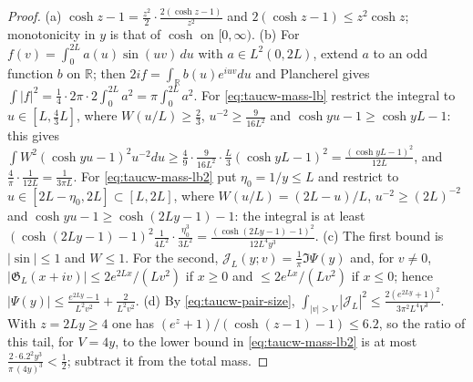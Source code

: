 \documentclass[11pt,a4paper]{article}
\numberwithin{equation}{section}
\theoremstyle{definition}
\theoremstyle{remark}
\begin{document}
\begin{proof}
(a) $\cosh z-1=\frac{z^2}2\cdot\frac{2(\cosh z-1)}{z^2}$ and $2(\cosh z-1)\le z^2\cosh z$; monotonicity in $y$ is that of $\cosh$ on $[0,\infty)$. (b) For $f(v)=\int_0^{2L}a(u)\sin(uv)\,du$ with $a\in L^2(0,2L)$, extend $a$ to an odd function $b$ on $\mathbb R$; then $2if=\int_{\mathbb R}b(u)e^{iuv}du$ and Plancherel gives $\int|f|^2=\frac14\cdot2\pi\cdot2\int_0^{2L}a^2=\pi\int_0^{2L}a^2$. For \eqref{eq:taucw-mass-lb} restrict the integral to $u\in[L,\frac43L]$, where $W(u/L)\ge\frac23$, $u^{-2}\ge\frac9{16L^2}$ and $\cosh yu-1\ge\cosh yL-1$: this gives $\int W^2(\cosh yu-1)^2u^{-2}du\ge\frac49\cdot\frac9{16L^2}\cdot\frac L3(\cosh yL-1)^2=\frac{(\cosh yL-1)^2}{12L}$, and $\frac4\pi\cdot\frac1{12L}=\frac1{3\pi L}$. For \eqref{eq:taucw-mass-lb2} put $\eta_0=1/y\le L$ and restrict to $u\in[2L-\eta_0,2L]\subset[L,2L]$, where $W(u/L)=(2L-u)/L$, $u^{-2}\ge(2L)^{-2}$ and $\cosh yu-1\ge\cosh(2Ly-1)-1$: the integral is at least $(\cosh(2Ly-1)-1)^2\frac1{4L^2}\cdot\frac{\eta_0^3}{3L^2}=\frac{(\cosh(2Ly-1)-1)^2}{12L^4y^3}$. (c) The first bound is $|\sin|\le1$ and $W\le1$. For the second, $\mathcal J_L(y;v)=\frac1\pi\Im\Psi(y)$ and, for $v\ne0$, $|\mathfrak G_L(x+iv)|\le2e^{2Lx}/(Lv^2)$ if $x\ge0$ and $\le2e^{Lx}/(Lv^2)$ if $x\le0$; hence $|\Psi(y)|\le\frac{e^{2Ly}-1}{L^2v^2}+\frac2{L^2v^2}$. (d) By \eqref{eq:taucw-pair-size}, $\int_{|v|>V}|\mathcal J_L|^2\le\frac{2(e^{2Ly}+1)^2}{3\pi^2L^4V^3}$. With $z=2Ly\ge4$ one has $(e^z+1)/(\cosh(z-1)-1)\le6.2$, so the ratio of this tail, for $V=4y$, to the lower bound in \eqref{eq:taucw-mass-lb2} is at most $\frac{2\cdot6.2^2y^3}{\pi\,(4y)^3}<\frac12$; subtract it from the total mass.
\end{proof}
\end{document}

